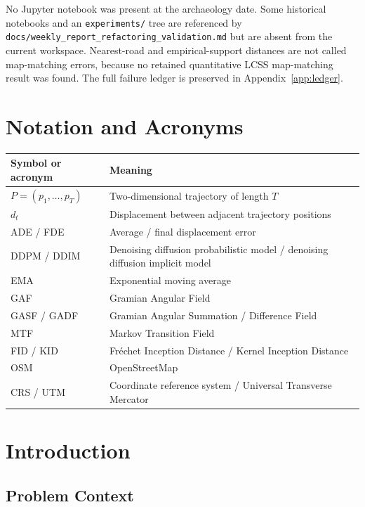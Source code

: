 \documentclass[12pt,a4paper,oneside]{report}
\begin{document}
No Jupyter notebook was present at the archaeology date. Some historical notebooks and an \texttt{experiments/} tree are referenced by \texttt{docs/weekly\_report\_refactoring\_validation.md} but are absent from the current workspace. Nearest-road and empirical-support distances are not called map-matching errors, because no retained quantitative LCSS map-matching result was found. The full failure ledger is preserved in Appendix~\ref{app:ledger}.

\tableofcontents
\listoffigures
\listoftables

\chapter*{Notation and Acronyms}
\begin{longtable}{L{0.20\textwidth}L{0.70\textwidth}}
\toprule
Symbol or acronym & Meaning \\
\midrule
$P=(p_1,\ldots,p_T)$ & Two-dimensional trajectory of length $T$ \\
$d_t$ & Displacement between adjacent trajectory positions \\
ADE / FDE & Average / final displacement error \\
DDPM / DDIM & Denoising diffusion probabilistic model / denoising diffusion implicit model \\
EMA & Exponential moving average \\
GAF & Gramian Angular Field \\
GASF / GADF & Gramian Angular Summation / Difference Field \\
MTF & Markov Transition Field \\
FID / KID & Fr\'echet Inception Distance / Kernel Inception Distance \\
OSM & OpenStreetMap \\
CRS / UTM & Coordinate reference system / Universal Transverse Mercator \\
\bottomrule
\end{longtable}

\clearpage
{}

\chapter{Introduction}
\label{chap:introduction}

\section{Problem Context}
\end{document}
